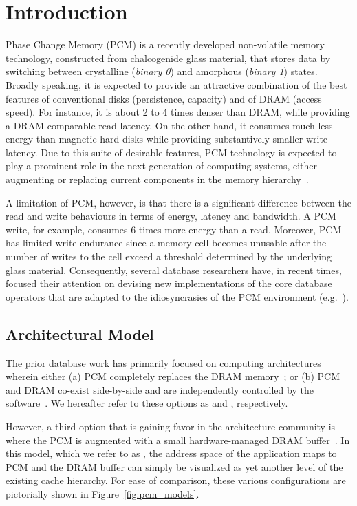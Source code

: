 \section{Introduction}
\label{sec:intro}
%
Phase Change Memory (PCM) is a recently developed non-volatile memory
technology, constructed from chalcogenide glass material, that stores
data by switching between crystalline (\emph{binary 0}) and amorphous 
(\emph{binary 1}) states. Broadly speaking, it is expected to provide an attractive
combination of the best features of conventional disks (persistence,
capacity) and of DRAM (access speed). For instance, it is
about 2 to 4 times denser than DRAM, while providing a DRAM-comparable
read latency.  On the other hand, it consumes much less energy
than magnetic hard disks while providing substantively smaller write latency. Due to this suite of  desirable features, PCM technology is
expected to play a prominent role in the next generation of computing
systems, either augmenting or replacing current components in the memory
hierarchy~\cite{qureshi,zhou,lee}.

A limitation of PCM, however, is that there is a significant difference
between the read and write behaviours in terms of energy, latency and
bandwidth. A PCM write, for example, consumes 6 times more energy than
a read. Moreover, PCM has limited write endurance since a memory cell
becomes unusable after the number of writes to the cell exceed a threshold
determined by the underlying glass material. Consequently, several database
researchers have, in recent times, focused their attention on devising
new implementations of the core database operators that are adapted to
the idiosyncrasies of the PCM environment (e.g.~\cite{chen,viglas}). 

\subsection*{Architectural Model}
The prior database work has primarily focused on computing
architectures wherein either (a) PCM completely replaces the
DRAM memory~\cite{chen}; or (b) PCM and DRAM co-exist side-by-side
and are independently controlled by the software~\cite{viglas}. We
hereafter refer to these options as {\bf \modelPcmRam{}} and
{\bf \modelExplicit{}}, respectively.

However, a third option that is gaining favor in the architecture
community is where the PCM is augmented with a small hardware-managed
DRAM buffer~\cite{qureshi}. In this model, which we refer to as
{\bf \model{}}, the address space of the application maps to PCM and the
DRAM buffer can simply be visualized as yet another level of the existing
cache hierarchy.  For ease of comparison, these various configurations
are pictorially shown in Figure~\ref{fig:pcm_models}.

